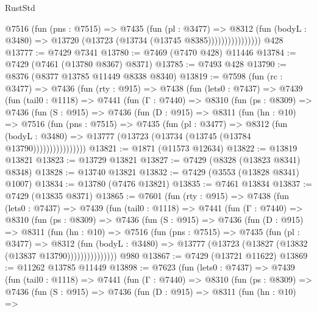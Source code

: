 \begin{lexlean}{RustStd}
\begin{coremodule}
                      @7516
                        (fun (pns : @7515) =>
                        @7435
                          (fun (pl : @3477) =>
                          @8312
                            (fun (bodyL : @3480) =>
                            @13720 (@13723 (@13734 (@13745 @8385))))))))))))))))
    @428
@13777 := @7429 @7341
@13780 := @7469 (@7470 @428) @11446
@13784 := @7429 (@7461 (@13780 @8367) @8371)
@13785 := @7493 @428
@13790 := @8376 (@8377 @13785 @11449 @8338 @8340)
@13819 := @7598
    (fun (rc : @3477) =>
    @7436
      (fun (rty : @915) =>
      @7438
        (fun (lets0 : @7437) =>
        @7439
          (fun (tail0 : @1118) =>
          @7441
            (fun (Γ : @7440) =>
            @8310
              (fun (ps : @8309) =>
              @7436
                (fun (S : @915) =>
                @7436
                  (fun (D : @915) =>
                  @8311
                    (fun (hn : @10) =>
                    @7516
                      (fun (pns : @7515) =>
                      @7435
                        (fun (pl : @3477) =>
                        @8312
                          (fun (bodyL : @3480) =>
                          @13777 (@13723 (@13734 (@13745 (@13784 @13790))))))))))))))))
@13821 := @1871 (@11573 @12634)
@13822 := @13819 @13821
@13823 := @13729 @13821
@13827 := @7429 (@8328 (@13823 @8341) @8348)
@13828 := @13740 @13821
@13832 := @7429 (@3553 (@13828 @8341) @1007)
@13834 := @13780 (@7476 @13821)
@13835 := @7461 @13834
@13837 := @7429 (@13835 @8371)
@13865 := @7601
    (fun (rty : @915) =>
    @7438
      (fun (lets0 : @7437) =>
      @7439
        (fun (tail0 : @1118) =>
        @7441
          (fun (Γ : @7440) =>
          @8310
            (fun (ps : @8309) =>
            @7436
              (fun (S : @915) =>
              @7436
                (fun (D : @915) =>
                @8311
                  (fun (hn : @10) =>
                  @7516
                    (fun (pns : @7515) =>
                    @7435
                      (fun (pl : @3477) =>
                      @8312
                        (fun (bodyL : @3480) =>
                        @13777 (@13723 (@13827 (@13832 (@13837 @13790)))))))))))))))
    @980
@13867 := @7429 (@13721 @11622)
@13869 := @11262 @13785 @11449
@13898 := @7623
    (fun (lets0 : @7437) =>
    @7439
      (fun (tail0 : @1118) =>
      @7441
        (fun (Γ : @7440) =>
        @8310
          (fun (ps : @8309) =>
          @7436
            (fun (S : @915) =>
            @7436
              (fun (D : @915) =>
              @8311
                (fun (hn : @10) =>

\end{coremodule}
\end{lexlean}
